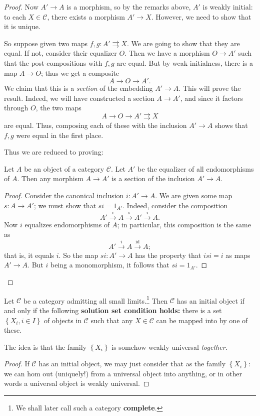 \begin{proposition}
\begin{proof}
Now $A' \to A$ is a morphism, so by the remarks above, $A'$ is weakly initial:
to each $X \in \mathcal{C}$, there exists a morphism $A' \to X$.
However, we need to show that it is unique.

So suppose given two maps $f,g: A' \rightrightarrows X$. We are going to show
that they are equal. If not, consider their equalizer $O$.
Then we have a morphism $O \to A'$ such that the post-compositions with $f,g$
are equal. But by weak initialness, there is a map $A \to O$; thus we get a
composite
\[ A \to O \to A'.  \]
We claim that this is a \emph{section} of the embedding $A'\to A$.
This will prove the result. Indeed, we will have constructed a section $A \to
A'$, and since it factors through $O$, the two maps
\[ A \to O \to A' \rightrightarrows X  \]
are equal. Thus, composing each of these with the inclusion $A' \to A$ shows
that $f,g$ were equal in the first place.

Thus we are reduced to proving:
\begin{lemma}
Let $A$ be an object of a category $\mathcal{C}$. Let $A'$ be the equalizer of
all endomorphisms of $A$. Then any morphism $A \to A'$ is a section of the
inclusion $A' \to A$.
\end{lemma}
\begin{proof}
Consider the canonical inclusion $i: A' \to A$. We are given some map $s: A
\to A'$; we must show that $si = 1_{A'}$.
Indeed, consider the composition
\[ A' \stackrel{i}{\to} A \stackrel{s}{\to} A' \stackrel{i}{\to} A .\]
Now $i$ equalizes endomorphisms of $A$; in particular, this composition is the
same as
\[ A' \stackrel{i}{\to} A \stackrel{\mathrm{id}}{\to} A; \]
that is, it equals $i$. So the map $si: A' \to A$ has the property that $isi =
i$ as maps $A' \to A$. But $i$ being a monomorphism, it follows that $si  =
1_{A'}$.
\end{proof}
\end{proof}

\begin{theorem}[Freyd]
Let $\mathcal{C}$ be a category admitting all small limits.\footnote{We shall
later call such a category \textbf{complete}.} Then $\mathcal{C}$ has an initial
object if and only if the following \textbf{solution set condition holds:}
there is a set $\left\{X_i, i \in I\right\}$ of objects in $\mathcal{C}$ such
that any $X \in \mathcal{C}$ can be mapped into by one of these.
\end{theorem}

The idea is that the family $\left\{X_i\right\}$ is somehow weakly universal
\emph{together.}
\begin{proof}
If $\mathcal{C}$ has an initial object, we may just consider that as the
family $\left\{X_i\right\}$: we can hom out (uniquely!) from a universal
object into anything, or in other words a universal object is weakly universal.


\end{proof}
\end{proposition}
